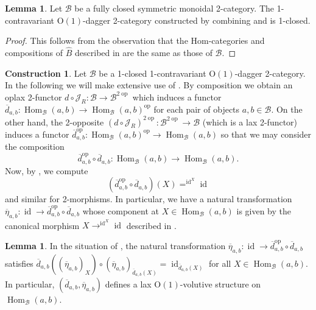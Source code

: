 \documentclass{article}
\newcommand{\opp}{\operatorname{op}}%
\newcommand{\id}{\operatorname{id}}%
\newcommand{\Hom}{\operatorname{Hom}}%
\newcommand{\Oone}{\operatorname{O(1)}}
\newcommand{\B}{\mathcal{B}}
\numberwithin{equation}{section}
\theoremstyle{definition}
\newtheorem{construction}[definition]{Construction}
\newtheorem{lemma}[definition]{Lemma}
\theoremstyle{theorem}
\begin{document}
\begin{lemma}\label{Lemma: Oone daggerification is still closed}
    Let $\B$ be a fully closed symmetric monoidal 2-category. The 1-contravariant $\Oone$-dagger 2-category constructed by combining 
     and  
    is 1-closed.
\end{lemma}
\begin{proof}
    This follows from the observation that the Hom-categories and compositions of $\hat{B}$ described in  
    are the same as those of $\B$.
\end{proof}
\begin{construction}\label{Construction: towards lax volutive structures on Hom-categories of sufficiently closed dagger 2-category}
    Let $\B$ be a 1-closed 1-contravariant $\Oone$-dagger 2-category. In the following we will make extensive use of .
    By composition we obtain an oplax 2-functor $d \circ \mathcal{J}_R \colon \B \to \B^{2\opp}$
    which induces a functor $\overline{d}_{a,b} \colon \Hom_{\B}(a,b) \to \Hom_{\B}(a,b)^{\opp}$ for each pair of objects $a,b\in \B$. On the other hand, the 
    2-opposite $(d \circ \mathcal{J}_R)^{2\opp} \colon \B^{2\opp} \to \B$ (which is a lax 2-functor) induces a functor 
    $\overline{d}_{a,b}^{\opp} \colon \Hom_{\B}(a,b)^{\opp} \to \Hom_{\B}(a,b)$ so that we may consider the composition 
    \begin{equation}
        \overline{d}_{a,b}^{\opp} \circ \overline{d}_{a,b} \colon \Hom_{\B}(a,b) \to \Hom_{\B}(a,b).
    \end{equation}
    Now, by , we compute
    \begin{equation}
        (\overline{d}_{a,b}^{\opp} \circ \overline{d}_{a,b})(X) = ^{\id^X}\!\id
    \end{equation}
    and similar for 2-morphisms. In particular, we have a natural transformation 
    $\overline{\eta}_{a,b} \colon \id \to \overline{d}_{a,b}^{\opp} \circ \overline{d}_{a,b}$ whose component at $X \in \Hom_{\B}(a,b)$ is given by 
    the canonical morphism $X \to ^{\id^X}\!\id$ described in . 
\end{construction}
\begin{lemma}\label{Lemma: lax volutive structures on Hom-category level}
    In the situation of , 
    the natural transformation $\overline{\eta}_{a,b} \colon \id \to \overline{d}_{a,b}^{\opp} \circ \overline{d}_{a,b}$ satisfies
    $\overline{d}_{a,b}((\overline{\eta}_{a,b})_X) \circ (\overline{\eta}_{a,b})_{\overline{d}_{a,b}(X)} = \id_{\overline{d}_{a,b}(X)}$ for all 
    $X \in \Hom_{\B}(a,b)$. In particular, $(\overline{d}_{a,b},\overline{\eta}_{a,b})$ defines a lax $\Oone$-volutive structure on $\Hom_{\B}(a,b)$. 
\end{lemma}
\end{document}
